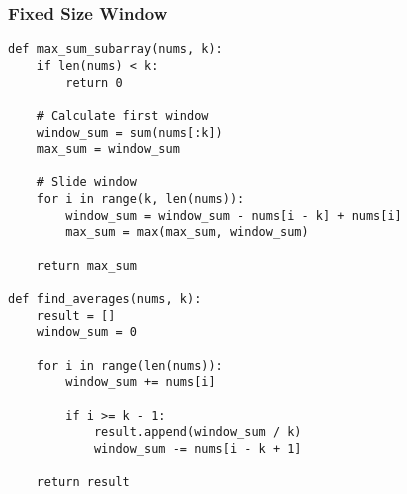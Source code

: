 \documentclass[10pt,a4paper]{article}
\begin{document}
\subsubsection{Fixed Size Window}
\begin{lstlisting}
def max_sum_subarray(nums, k):
    if len(nums) < k:
        return 0

    # Calculate first window
    window_sum = sum(nums[:k])
    max_sum = window_sum

    # Slide window
    for i in range(k, len(nums)):
        window_sum = window_sum - nums[i - k] + nums[i]
        max_sum = max(max_sum, window_sum)

    return max_sum

def find_averages(nums, k):
    result = []
    window_sum = 0

    for i in range(len(nums)):
        window_sum += nums[i]

        if i >= k - 1:
            result.append(window_sum / k)
            window_sum -= nums[i - k + 1]

    return result
\end{lstlisting}
\end{document}
